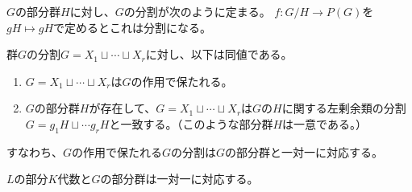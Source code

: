 \begin{proposition}
    \label{subgroup-decomp}
    $G$の部分群$H$に対し、$G$の分割が次のように定まる。
    $f:G/H\to P(G)$を$gH\mapsto gH$で定めるとこれは分割になる。
\end{proposition}

\begin{proposition}\label{group-decomp}
    群$G$の分割$G=X_1\sqcup\cdots\sqcup X_r$に対し、以下は同値である。
    \begin{enumerate}
        \item $G=X_1\sqcup\cdots\sqcup X_r$は$G$の作用で保たれる。
        \item $G$の部分群$H$が存在して、$G=X_1\sqcup\cdots\sqcup X_r$は$G$の$H$に関する左剰余類の分割$G=g_1H\sqcup\cdots g_rH$と一致する。（このような部分群$H$は一意である。）
    \end{enumerate}
    すなわち、$G$の作用で保たれる$G$の分割は$G$の部分群と一対一に対応する。
\end{proposition}

\begin{theorem}\label{main}
    $L$の部分$K$代数と$G$の部分群は一対一に対応する。
\end{theorem}